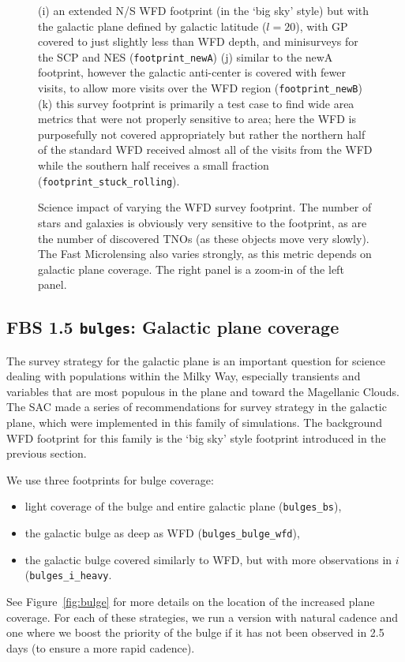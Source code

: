 \begin{figure}
{(i) an extended N/S WFD footprint (in the `big sky' style) but with the galactic plane defined by galactic latitude ($l=20$), with GP covered to just slightly less than WFD depth, and minisurveys for the SCP and NES ({\tt footprint\_newA})
(j) similar to the newA footprint, however the galactic anti-center is covered with fewer visits, to allow more visits over the WFD region ({\tt footprint\_newB})
(k) this survey footprint is primarily a test case to find wide area metrics that were not properly sensitive to area; here the WFD is purposefully not covered appropriately but rather the northern half of the standard WFD received almost all of the visits from the WFD while the southern half receives a small fraction ({\tt footprint\_stuck\_rolling}).
}
\label{fig:footprints_footprints}
\end{figure}

\begin{figure}
\caption{Science impact of varying the WFD survey footprint. The number of stars and galaxies is obviously very sensitive to the footprint, as are the number of discovered TNOs (as these objects move very slowly). The Fast Microlensing also varies strongly, as this metric depends on galactic plane coverage. The right panel is a zoom-in of the left panel.}
\label{fig:footprint_radar}
\end{figure}

\subsection{FBS 1.5 {\tt bulges}: Galactic plane coverage}\label{ss:bulges}

The survey strategy for the galactic plane is an important question for science dealing with populations within the Milky Way, especially transients and variables that are most populous in the plane and toward the Magellanic Clouds. The SAC made a series of recommendations for survey strategy in the galactic plane, which were implemented in this family of simulations. The background WFD footprint for this family is the `big sky' style footprint introduced in the previous section. 

We use three footprints for bulge coverage: 
\begin{itemize}
\item light coverage of the bulge and entire galactic plane ({\tt bulges\_bs}),
\item the galactic bulge as deep as WFD ({\tt bulges\_bulge\_wfd}), 
\item the galactic bulge covered similarly to WFD, but with more observations in $i$ ({\tt bulges\_i\_heavy}.  
\end{itemize}
See Figure~\ref{fig:bulge} for more details on the location of the increased plane coverage. 
For each of these strategies, we run a version with natural cadence and one where we boost the priority of the bulge if it has not been observed in 2.5 days (to ensure a more rapid cadence). 

